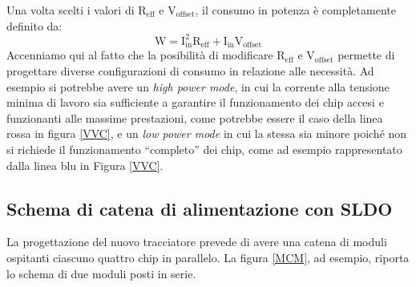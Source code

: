 Una volta scelti i valori di $\mathrm{R_{eff}}$ e $\mathrm{V_{offset}}$, il consumo in potenza è completamente definito da:
\begin{equation}
\mathrm{W=I_{in}^2R_{eff}+I_{in}V_{offset}}
\end{equation}
Accenniamo qui al fatto che la posibilità di modificare $\mathrm{R_{eff}}$ e $\mathrm{V_{offset}}$ permette di progettare diverse configurazioni di consumo in relazione alle necessità.
Ad esempio si potrebbe avere un \textit{high power mode}, in cui la corrente alla tensione minima di lavoro sia sufficiente a garantire il funzionamento dei chip accesi e funzionanti alle massime prestazioni, come potrebbe essere il caso della linea rossa in figura \ref{VVC}, e un \textit{low power mode} in cui la stessa sia minore poiché non si richiede il funzionamento ``completo'' dei chip, come ad esempio rappresentato dalla linea blu in Figura \ref{VVC}.


\subsection{Schema di catena di alimentazione con SLDO}

La progettazione del nuovo tracciatore prevede di avere una catena di moduli ospitanti ciascuno quattro chip in parallelo.
La figura \ref{MCM}, ad esempio, riporta lo schema di due moduli posti in serie.

